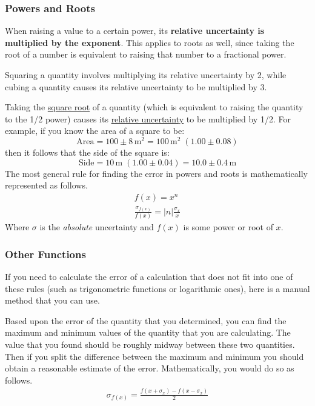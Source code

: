 \subsubsection{Powers and Roots}

When raising a value to a certain power, its \textbf{relative uncertainty is multiplied by the exponent}. This applies to roots as well, since taking the root of a number is equivalent to raising that number to a fractional power.\myskip

Squaring a quantity involves multiplying its relative uncertainty by 2, while cubing a quantity causes its relative uncertainty to be multiplied by 3.\myskip

Taking the \underline{square root} of a quantity (which is equivalent to raising the quantity to the 1/2 power) causes its \underline{relative uncertainty} to be multiplied by 1/2. For example, if you know the area of a square to be:
\begin{equation}
    \text{Area} = 100\pm 8\,\mathrm{m^2} = 100\,\mathrm{m}^2\;(1.00\pm 0.08)
\end{equation}
then it follows that the side of the square is:
\begin{equation}
    \text{Side} = 10\,\mathrm{m}\;\left( 1.00\pm 0.04 \right) = 10.0\pm 0.4\,\mathrm{m}
\end{equation}
The most general rule for finding the error in powers and roots is mathematically represented as follows.
\begin{gather}
f(x) = x^n \\
\frac{\sigma_{f(x)}}{f(x)} = |n| \frac{\sigma_x}{x}
\end{gather}
Where $\sigma$ is the {\it{absolute}} uncertainty and $f(x)$ is some power or root of $x$.

\subsubsection{Other Functions}

If you need to calculate the error of a calculation that does not fit into one of these rules (such as trigonometric functions or logarithmic ones), here is a manual method that you can use.\myskip

Based upon the error of the quantity that you determined, you can find the maximum and minimum values of the quantity that you are calculating. The value that you found should be roughly midway between these two quantities. Then if you split the difference between the maximum and minimum you should obtain a reasonable estimate of the error. Mathematically, you would do so as follows.
\begin{gather}
\sigma_{f(x)} = \frac{f(x + \sigma_x) - f(x - \sigma_x)}{2}
\end{gather}

